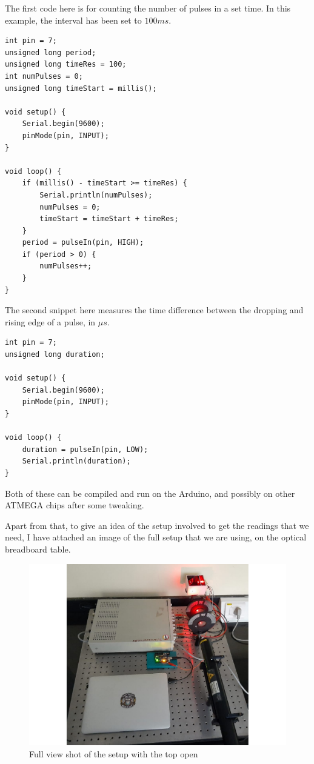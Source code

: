 \documentclass{double}
\begin{document}
\begin{multicols*}{2}
The first code here is for counting the number of pulses in a set time. In this example, the interval has been set to $100\si{ms}$.
\lstset{
	language=C++,
	basicstyle=\ttfamily\footnotesize,
	frame=trBL,
}
\begin{lstlisting}[caption={num\_pulses.ino}]
int pin = 7;
unsigned long period;
unsigned long timeRes = 100;
int numPulses = 0;
unsigned long timeStart = millis();

void setup() {
	Serial.begin(9600);
	pinMode(pin, INPUT);
}

void loop() {
	if (millis() - timeStart >= timeRes) {
		Serial.println(numPulses);
		numPulses = 0;
		timeStart = timeStart + timeRes; 
	}
	period = pulseIn(pin, HIGH);
	if (period > 0) {
		numPulses++;
	}
}
\end{lstlisting}

The second snippet here measures the time difference between the dropping and rising edge of a pulse, in $\si{\mu s}$.
\begin{lstlisting}[caption={time\_difference.ino}]
int pin = 7;
unsigned long duration;

void setup() {
	Serial.begin(9600);
	pinMode(pin, INPUT);
}

void loop() {
	duration = pulseIn(pin, LOW);
	Serial.println(duration);
}	
\end{lstlisting}
Both of these can be compiled and run on the Arduino, and possibly on other ATMEGA chips after some tweaking.

Apart from that, to give an idea of the setup involved to get the readings that we need, I have attached an image of the full setup that we are using, on the optical breadboard table.
\begin{figure}[H]
	\centering
	\includegraphics[width=0.8\columnwidth]{images/setup.pdf}
	\caption{Full view shot of the setup with the top open}
\end{figure}


\end{multicols*}
\end{document}

